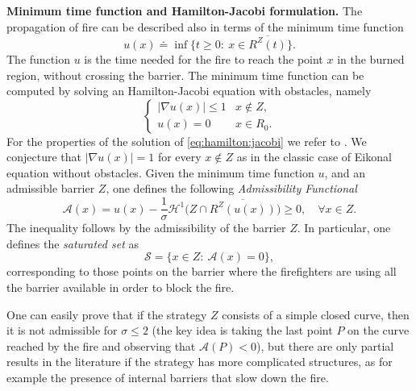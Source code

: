 \documentclass[reqno]{amsart}
\theoremstyle{definition} \newtheorem{definition}{Definition}[section]
\theoremstyle{definition} \newtheorem{remark}[definition]{Remark}
\theoremstyle{plain} \newtheorem{lemma}[definition]{Lemma}
\theoremstyle{plain} \newtheorem{proposition}[definition]{Proposition}
\theoremstyle{plain} \newtheorem{theorem}[definition]{Theorem}
\theoremstyle{plain} \newtheorem{corollary}[definition]{Corollary}
\theoremstyle{definition} \newtheorem{example}[definition]{Example}
\theoremstyle{plain} \newtheorem{claim}[clai]{Claim}
\theoremstyle{definition} \newtheorem{assumption}[definition]{Assumption}
\theoremstyle{definition} \newtheorem{observation}[definition]{Observation}
\newcommand{\1}{\mathbbm 1}
\renewcommand{\H}{\mathscr H}
\numberwithin{equation}{section} %
\theoremstyle{plain} \newtheorem*{theorem*}{Theorem}
\theoremstyle{plain} \newtheorem{mthm}[maintheorem]{Main Theorem}
\theoremstyle{plain} \newtheorem*{mthm*}{Main Theorem}
\theoremstyle{plain} \newtheorem*{conjecture*}{Conjecture}
\theoremstyle{plain} \newtheorem{conjecture}[definition]{Conjecture}
\theoremstyle{plain} \newtheorem*{problem*}{Problem}
\begin{document}
\medskip

 \textbf{Minimum time function and Hamilton-Jacobi formulation.} The propagation of fire can be described also in terms of the minimum time function
\begin{equation}\label{eq:min:time:function}
u(x) \doteq \inf \big\lbrace t \geq 0:\ x \in \overline{R^Z(t)} \big\rbrace.
\end{equation}
The function $u$ is the time needed for the fire to reach the point $x$ in the burned region, without crossing the barrier. The minimum time function can be computed by solving an Hamilton-Jacobi equation with obstacles, namely
\begin{equation}
\label{eq:hamilton:jacobi}
\begin{cases}
|\nabla u(x)|\leq 1 & x\not\in Z, \\
u(x)=0 & x\in R_0.
\end{cases}
\end{equation}
For the properties of the solution of \eqref{eq:hamilton:jacobi} we refer to \cite{delellisrobyr}. We conjecture that $|\nabla u(x)|=1$ for every $x\not\in Z$ as in the classic case of Eikonal equation without obstacles. Given the minimum time function $u$, and an admissible barrier $Z$, one defines the following \emph{Admissibility Functional}
\begin{equation*}
\mathcal A(x) = u(x) - \frac{1}{\sigma} \H^1 \big( Z\cap\overline{R^Z(u(x))} \big) \geq 0, \quad \forall x \in Z.
\end{equation*}
The inequality follows by the admissibility of the barrier $Z$.
In particular, one defines the \emph{saturated set} as
\begin{equation*}
\mathcal{S} = \big\lbrace x \in Z:\ \mathcal A(x) = 0 \big\rbrace,
\end{equation*}
corresponding to those points on the barrier where the firefighters are using all the barrier available in order to block the fire.

One can easily prove that if the strategy $Z$ consists of a simple closed curve, then it is not admissible for $\sigma\leq 2$ \cite{Bressan_2007} (the key idea is taking the last point $P$ on the curve reached by the fire and observing that $\mathcal{A}(P)<0$), but there are only partial results in the literature if the strategy has more complicated structures, as for example the presence of internal barriers that slow down the fire.
\medskip
\end{document}
